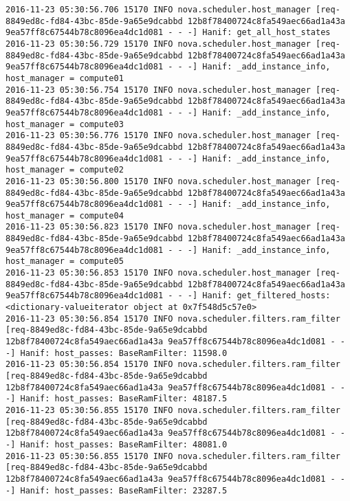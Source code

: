 \begin{lstlisting}[frame=single, caption={The cPlex based scheduler log trace for 10 virtual instances}, label={lst:tucschedulercodetracelog10vi}, escapechar=|]
2016-11-23 05:30:56.706 15170 INFO nova.scheduler.host_manager [req-8849ed8c-fd84-43bc-85de-9a65e9dcabbd 12b8f78400724c8fa549aec66ad1a43a 9ea57ff8c67544b78c8096ea4dc1d081 - - -] Hanif: get_all_host_states
2016-11-23 05:30:56.729 15170 INFO nova.scheduler.host_manager [req-8849ed8c-fd84-43bc-85de-9a65e9dcabbd 12b8f78400724c8fa549aec66ad1a43a 9ea57ff8c67544b78c8096ea4dc1d081 - - -] Hanif: _add_instance_info, host_manager = compute01
2016-11-23 05:30:56.754 15170 INFO nova.scheduler.host_manager [req-8849ed8c-fd84-43bc-85de-9a65e9dcabbd 12b8f78400724c8fa549aec66ad1a43a 9ea57ff8c67544b78c8096ea4dc1d081 - - -] Hanif: _add_instance_info, host_manager = compute03
2016-11-23 05:30:56.776 15170 INFO nova.scheduler.host_manager [req-8849ed8c-fd84-43bc-85de-9a65e9dcabbd 12b8f78400724c8fa549aec66ad1a43a 9ea57ff8c67544b78c8096ea4dc1d081 - - -] Hanif: _add_instance_info, host_manager = compute02
2016-11-23 05:30:56.800 15170 INFO nova.scheduler.host_manager [req-8849ed8c-fd84-43bc-85de-9a65e9dcabbd 12b8f78400724c8fa549aec66ad1a43a 9ea57ff8c67544b78c8096ea4dc1d081 - - -] Hanif: _add_instance_info, host_manager = compute04
2016-11-23 05:30:56.823 15170 INFO nova.scheduler.host_manager [req-8849ed8c-fd84-43bc-85de-9a65e9dcabbd 12b8f78400724c8fa549aec66ad1a43a 9ea57ff8c67544b78c8096ea4dc1d081 - - -] Hanif: _add_instance_info, host_manager = compute05
2016-11-23 05:30:56.853 15170 INFO nova.scheduler.host_manager [req-8849ed8c-fd84-43bc-85de-9a65e9dcabbd 12b8f78400724c8fa549aec66ad1a43a 9ea57ff8c67544b78c8096ea4dc1d081 - - -] Hanif: get_filtered_hosts: <dictionary-valueiterator object at 0x7f548d5c57e0>
2016-11-23 05:30:56.854 15170 INFO nova.scheduler.filters.ram_filter [req-8849ed8c-fd84-43bc-85de-9a65e9dcabbd 12b8f78400724c8fa549aec66ad1a43a 9ea57ff8c67544b78c8096ea4dc1d081 - - -] Hanif: host_passes: BaseRamFilter: 11598.0
2016-11-23 05:30:56.854 15170 INFO nova.scheduler.filters.ram_filter [req-8849ed8c-fd84-43bc-85de-9a65e9dcabbd 12b8f78400724c8fa549aec66ad1a43a 9ea57ff8c67544b78c8096ea4dc1d081 - - -] Hanif: host_passes: BaseRamFilter: 48187.5
2016-11-23 05:30:56.855 15170 INFO nova.scheduler.filters.ram_filter [req-8849ed8c-fd84-43bc-85de-9a65e9dcabbd 12b8f78400724c8fa549aec66ad1a43a 9ea57ff8c67544b78c8096ea4dc1d081 - - -] Hanif: host_passes: BaseRamFilter: 48081.0
2016-11-23 05:30:56.855 15170 INFO nova.scheduler.filters.ram_filter [req-8849ed8c-fd84-43bc-85de-9a65e9dcabbd 12b8f78400724c8fa549aec66ad1a43a 9ea57ff8c67544b78c8096ea4dc1d081 - - -] Hanif: host_passes: BaseRamFilter: 23287.5

\end{lstlisting}
